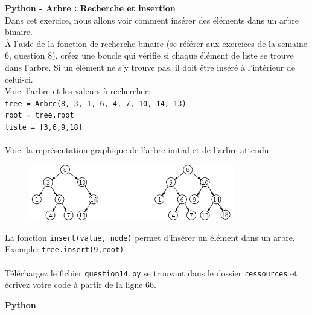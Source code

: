 \begin{Exercice}[5 minutes] \textbf{Python - Arbre : Recherche et insertion}\\

Dans cet exercice, nous allons voir comment insérer des éléments dans un arbre binaire.\\

À l'aide de la fonction de recherche binaire (se référer aux exercices de la semaine 6, question 8), créez une boucle qui vérifie si chaque élément de liste se trouve dans l'arbre. Si un élément ne s'y trouve pas, il doit être inséré à l'intérieur de celui-ci. \\

Voici l'arbre et les valeurs à rechercher:\\
\lstinline{tree = Arbre(8, 3, 1, 6, 4, 7, 10, 14, 13)}\\
\lstinline{root = tree.root}\\
\lstinline{liste = [3,6,9,18]}\\\\
Voici la représentation graphique de l'arbre initial et de l'arbre attendu: 
\begin{figure}[h]
    \centering
    \includegraphics[width=0.80\textwidth]{img/binary-tree.png}
\end{figure}

\begin{conseil}
    La fonction \lstinline{insert(value, node)} permet d'insérer un élément dans un arbre. Exemple: \lstinline{tree.insert(9,root)}\\\\
    Téléchargez le fichier \lstinline{question14.py} se trouvant dans le dossier \lstinline{ressources} et écrivez votre code à partir de la ligne 66. 
\end{conseil}

\begin{solution}
    \textbf{Python} \\

     
\end{solution}

\end{Exercice}


